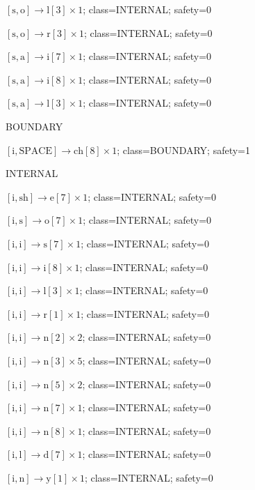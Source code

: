 \(\left[\mathrm{s}, \mathrm{o}\right] \to \mathrm{l}[3] \times 1\); class=INTERNAL; safety=0\par
\(\left[\mathrm{s}, \mathrm{o}\right] \to \mathrm{r}[3] \times 1\); class=INTERNAL; safety=0\par
\(\left[\mathrm{s}, \mathrm{a}\right] \to \mathrm{i}[7] \times 1\); class=INTERNAL; safety=0\par
\(\left[\mathrm{s}, \mathrm{a}\right] \to \mathrm{i}[8] \times 1\); class=INTERNAL; safety=0\par
\(\left[\mathrm{s}, \mathrm{a}\right] \to \mathrm{l}[3] \times 1\); class=INTERNAL; safety=0\par
BOUNDARY\par
\(\left[\mathrm{i}, \mathrm{SPACE}\right] \to \mathrm{ch}[8] \times 1\); class=BOUNDARY; safety=1\par
INTERNAL\par
\(\left[\mathrm{i}, \mathrm{sh}\right] \to \mathrm{e}[7] \times 1\); class=INTERNAL; safety=0\par
\(\left[\mathrm{i}, \mathrm{s}\right] \to \mathrm{o}[7] \times 1\); class=INTERNAL; safety=0\par
\(\left[\mathrm{i}, \mathrm{i}\right] \to \mathrm{s}[7] \times 1\); class=INTERNAL; safety=0\par
\(\left[\mathrm{i}, \mathrm{i}\right] \to \mathrm{i}[8] \times 1\); class=INTERNAL; safety=0\par
\(\left[\mathrm{i}, \mathrm{i}\right] \to \mathrm{l}[3] \times 1\); class=INTERNAL; safety=0\par
\(\left[\mathrm{i}, \mathrm{i}\right] \to \mathrm{r}[1] \times 1\); class=INTERNAL; safety=0\par
\(\left[\mathrm{i}, \mathrm{i}\right] \to \mathrm{n}[2] \times 2\); class=INTERNAL; safety=0\par
\(\left[\mathrm{i}, \mathrm{i}\right] \to \mathrm{n}[3] \times 5\); class=INTERNAL; safety=0\par
\(\left[\mathrm{i}, \mathrm{i}\right] \to \mathrm{n}[5] \times 2\); class=INTERNAL; safety=0\par
\(\left[\mathrm{i}, \mathrm{i}\right] \to \mathrm{n}[7] \times 1\); class=INTERNAL; safety=0\par
\(\left[\mathrm{i}, \mathrm{i}\right] \to \mathrm{n}[8] \times 1\); class=INTERNAL; safety=0\par
\(\left[\mathrm{i}, \mathrm{l}\right] \to \mathrm{d}[7] \times 1\); class=INTERNAL; safety=0\par
\(\left[\mathrm{i}, \mathrm{n}\right] \to \mathrm{y}[1] \times 1\); class=INTERNAL; safety=0\par
